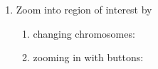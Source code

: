 \begin{enumerate}
\begin{figure}[ht]
{    }
  \end{figure}
  \pagebreak
\item Zoom into region of interest by
  \begin{enumerate}
  \item changing chromosomes:
    \begin{figure}[ht]
      \centering
    \end{figure}
  \item zooming in with buttons:
    \begin{figure}[ht]
      \centering
\end{figure}
\end{enumerate}
\end{enumerate}
